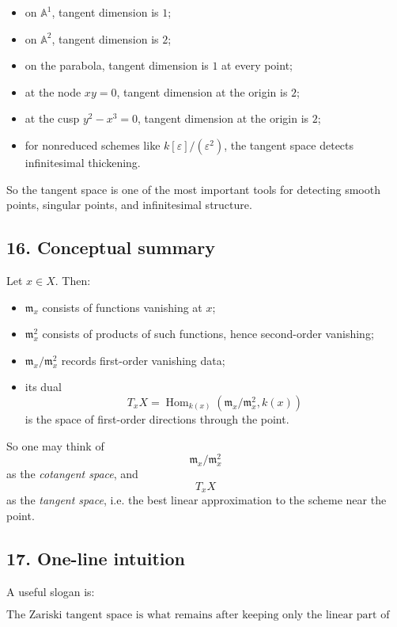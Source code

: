 \documentclass[12pt,a4paper]{article}
\theoremstyle{plain}
\theoremstyle{definition}      %
\begin{document}
	\begin{itemize}
		\item on \(\mathbb A^1\), tangent dimension is \(1\);
		\item on \(\mathbb A^2\), tangent dimension is \(2\);
		\item on the parabola, tangent dimension is \(1\) at every point;
		\item at the node \(xy=0\), tangent dimension at the origin is \(2\);
		\item at the cusp \(y^2-x^3=0\), tangent dimension at the origin is \(2\);
		\item for nonreduced schemes like \(k[\varepsilon]/(\varepsilon^2)\), the tangent space detects infinitesimal thickening.
	\end{itemize}
	
	So the tangent space is one of the most important tools for detecting smooth points, singular points, and infinitesimal structure.
	
	\subsection*{16. Conceptual summary}
	
	Let \(x\in X\). Then:
	
	\begin{itemize}
		\item \(\mathfrak m_x\) consists of functions vanishing at \(x\);
		\item \(\mathfrak m_x^2\) consists of products of such functions, hence second-order vanishing;
		\item \(\mathfrak m_x/\mathfrak m_x^2\) records first-order vanishing data;
		\item its dual
		\[
		T_xX=\operatorname{Hom}_{k(x)}(\mathfrak m_x/\mathfrak m_x^2,k(x))
		\]
		is the space of first-order directions through the point.
	\end{itemize}
	
	So one may think of
	\[
	\mathfrak m_x/\mathfrak m_x^2
	\]
	as the \emph{cotangent space}, and
	\[
	T_xX
	\]
	as the \emph{tangent space}, i.e. the best linear approximation to the scheme near the point.
	
	\subsection*{17. One-line intuition}
	
	A useful slogan is:
	
	\[
	\boxed{
		\text{The Zariski tangent space is what remains after keeping only the linear part of the local equations at the point.}
	}
	\]
	
\end{document}
